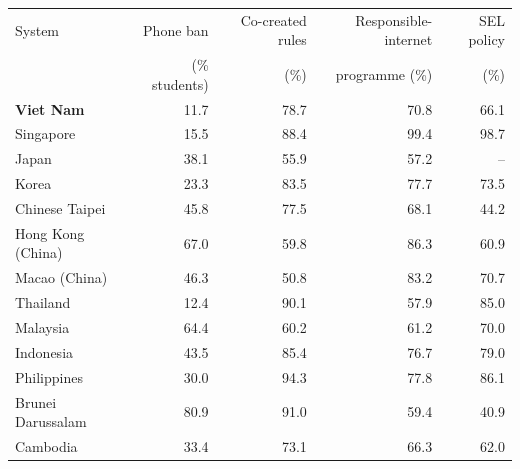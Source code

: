 \begin{tabular}{@{}lrrrr@{}}
\toprule
System & Phone ban & Co-created rules & Responsible-internet & SEL policy \\
 & (\% students) & (\%) & programme (\%) & (\%) \\
\midrule
\textbf{Viet Nam} & 11.7 & 78.7 & 70.8 & 66.1 \\
Singapore & 15.5 & 88.4 & 99.4 & 98.7 \\
Japan & 38.1 & 55.9 & 57.2 & -- \\
Korea & 23.3 & 83.5 & 77.7 & 73.5 \\
Chinese Taipei & 45.8 & 77.5 & 68.1 & 44.2 \\
Hong Kong (China) & 67.0 & 59.8 & 86.3 & 60.9 \\
Macao (China) & 46.3 & 50.8 & 83.2 & 70.7 \\
Thailand & 12.4 & 90.1 & 57.9 & 85.0 \\
Malaysia & 64.4 & 60.2 & 61.2 & 70.0 \\
Indonesia & 43.5 & 85.4 & 76.7 & 79.0 \\
Philippines & 30.0 & 94.3 & 77.8 & 86.1 \\
Brunei Darussalam & 80.9 & 91.0 & 59.4 & 40.9 \\
Cambodia & 33.4 & 73.1 & 66.3 & 62.0 \\
\bottomrule
\end{tabular}
